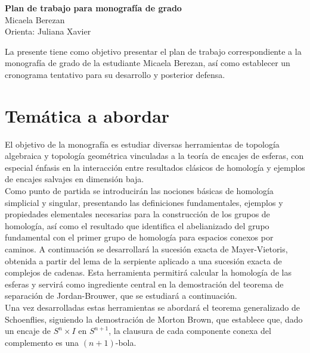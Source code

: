 \documentclass[11pt]{article}
\begin{document}
\begin{center}
    {\Large \textbf{Plan de trabajo para monografía de grado}}\\[1em]
    {\large Micaela Berezan}\\[0.5em]
    Orienta:  Juliana Xavier 
\end{center}

\vspace{1em}

La presente tiene como objetivo presentar el plan de trabajo correspondiente a
la monografía de grado de la estudiante Micaela Berezan, así como establecer un
cronograma tentativo para su desarrollo y posterior defensa.

\vspace{1em}

\section*{Temática a abordar}

El objetivo de la monografía es estudiar diversas herramientas de topología
algebraica y topología geométrica vinculadas a la teoría de encajes de esferas,
con especial énfasis en la interacción entre resultados clásicos de homología y
ejemplos de encajes salvajes en  dimensión baja.\\



Como punto de partida se introducirán las nociones básicas de homología simplicial y singular, presentando las definiciones fundamentales, ejemplos y propiedades elementales necesarias para la construcción de los grupos de homología, así como el resultado que identifica el abelianizado del grupo fundamental con el primer grupo de homología para espacios conexos por caminos. A continuación se desarrollará la sucesión exacta de Mayer-Vietoris, obtenida a partir del lema de la serpiente aplicado a una sucesión exacta de complejos de cadenas. Esta herramienta permitirá calcular la homología de las esferas y servirá como ingrediente central en la demostración del teorema de separación de Jordan-Brouwer, que se estudiará a continuación.\\


Una vez desarrolladas estas herramientas se abordará el teorema generalizado de
Schoenflies, siguiendo la demostración de Morton Brown, que establece que, dado
un encaje de $S^{n}\times I$ en $S^{n+1}$, la clausura de cada componente conexa
del complemento es una $(n+1)$-bola.\\
\end{document}
